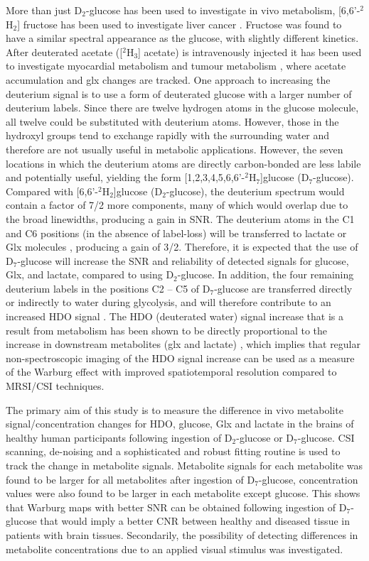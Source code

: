 \documentclass[class=article, crop=false]{standalone}
\begin{document}
More than just D$_2$-glucose has been used to investigate in vivo metabolism, [6,6'-$^2$H$_2$] fructose has been used to investigate liver cancer \cite{Zhang202366-2H2Cancer}. Fructose was found to have a similar spectral appearance as the glucose, with slightly different kinetics. After deuterated acetate ([$^2$H$_3$] acetate) is intravenously injected it has been used to investigate myocardial metabolism \cite{Wang2021NoninvasiveImaging} and tumour metabolism \cite{DeFeyter2018DeuteriumVivo}, where acetate accumulation and glx changes are tracked. One approach to increasing the deuterium signal is to use a form of deuterated glucose with a larger number of deuterium labels. Since there are twelve hydrogen atoms in the glucose molecule, all twelve could be substituted with deuterium atoms. However, those in the hydroxyl groups tend to exchange rapidly with the surrounding water and therefore are not usually useful in metabolic applications. However, the seven locations in which the deuterium atoms are directly carbon-bonded are less labile and potentially useful, yielding the form [1,2,3,4,5,6,6'-$^2$H$_7$]glucose (D$_7$-glucose). Compared with [6,6'-$^2$H$_2$]glucose (D$_2$-glucose), the deuterium spectrum would contain a factor of 7/2 more components, many of which would overlap due to the broad linewidths, producing a gain in SNR. The deuterium atoms in the C1 and C6 positions (in the absence of label-loss) will be transferred to lactate or Glx molecules \cite{DeFeyter2020DeuteriumBrain}, producing a gain of 3/2. Therefore, it is expected that the use of D$_7$-glucose will increase the SNR and reliability of detected signals for glucose, Glx, and lactate, compared to using D$_2$-glucose. In addition, the four remaining deuterium labels in the positions C2 – C5 of D$_7$-glucose are transferred directly or indirectly to water during glycolysis, and will therefore contribute to an increased HDO signal \cite{Mahar2020HDOMetabolism, Mahar2021DeuteratedGlucose}. The HDO (deuterated water) signal increase that is a result from metabolism has been shown to be directly proportional to the increase in downstream metabolites (glx and lactate) \cite{Mahar2021DeuteratedGlucose}, which implies that regular non-spectroscopic imaging of the HDO signal increase can be used as a measure of the Warburg effect with improved spatiotemporal resolution compared to MRSI/CSI techniques. 

The primary aim of this study is to measure the difference in vivo metabolite signal/concentration changes for HDO, glucose, Glx and lactate in the brains of healthy human participants following ingestion of D$_2$-glucose or D$_7$-glucose. CSI scanning, de-noising and a sophisticated and robust fitting routine is used to track the change in metabolite signals. Metabolite signals for each metabolite was found to be larger for all metabolites after ingestion of D$_7$-glucose, concentration values were also found to be larger in each metabolite except glucose. This shows that Warburg maps with better SNR can be obtained following ingestion of D$_7$-glucose that would imply a better CNR between healthy and diseased tissue in patients with brain tissues. Secondarily, the possibility of detecting differences in metabolite concentrations due to an applied visual stimulus was investigated.  
\end{document}
